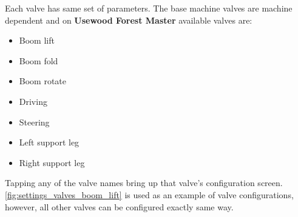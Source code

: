 \documentclass[12pt,a4paper,english]{uvmanual}
\begin{document}
Each valve has same set of parameters. The base machine valves are machine dependent and on \textbf{Usewood Forest Master} available valves are:

\begin{itemize}
 \item Boom lift
 \item Boom fold
 \item Boom rotate
 \item Driving
 \item Steering
 \item Left support leg
 \item Right support leg
\end{itemize}

Tapping any of the valve names bring up that valve's configuration screen. \autoref{fig:settings_valves_boom_lift} is used as an example of valve configurations, however, all other valves can be configured exactly same way.


\end{document}
